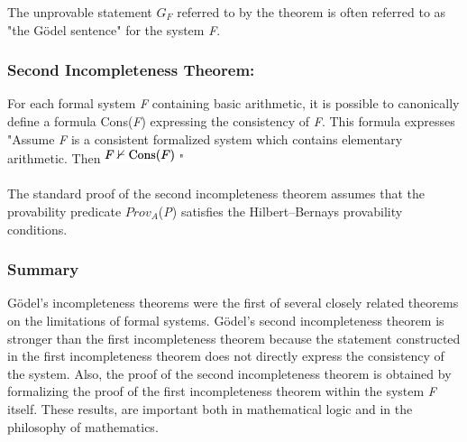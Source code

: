 \documentclass{article}
\begin{document}
The unprovable statement $G_{F}$ referred to by the theorem is often referred to as "the Gödel sentence" for the system \emph{F}. 

\subsubsection*{Second Incompleteness Theorem:} 
For each formal system \emph{F} containing basic arithmetic, it is possible to canonically define a formula Cons(\emph{F}) expressing the consistency of \emph{F}. This formula expresses\\

 "Assume \emph{F} is a consistent formalized system which contains elementary arithmetic. Then \includegraphics[scale=.6]{image} " \\\\
 The standard proof of the second incompleteness theorem assumes that the provability predicate $Prov_{A}$(\emph{P}) satisfies the Hilbert–Bernays provability conditions. 

\subsubsection*{Summary}
Gödel's incompleteness theorems were the first of several closely related theorems on the limitations of formal systems. Gödel's second incompleteness theorem is stronger than the first incompleteness theorem because the statement constructed in the first incompleteness theorem does not directly express the consistency of the system. Also, the proof of the second incompleteness theorem is obtained by formalizing the proof of the first incompleteness theorem within the system \emph{F} itself. These results, are important both in mathematical logic and in the philosophy of mathematics. 
\end{document}
